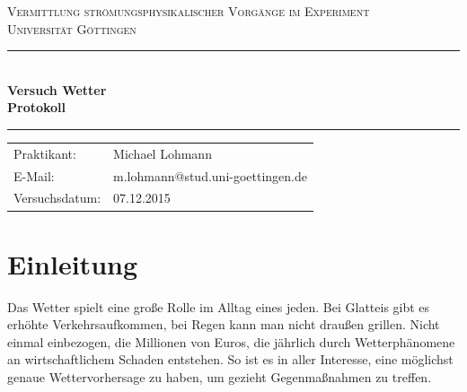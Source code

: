 \documentclass[12pt,a4paper,titlepage,headinclude,bibtotoc]{scrartcl}
\begin{document}
\begin{titlepage}
\centering
\textsc{\Large Vermittlung strömungsphysikalischer Vorgänge im Experiment
\\[1.5ex] Universität Göttingen}

\vspace*{3cm}

\rule{\textwidth}{1pt}\\[0.5cm]
{\huge \bfseries
  Versuch Wetter  \\[1.5ex]
  Protokoll}\\[0.5cm]
\rule{\textwidth}{1pt}

\vspace*{3cm}

\begin{Large}
\begin{tabular}{ll}
Praktikant: &  Michael Lohmann\\
 E-Mail: & m.lohmann@stud.uni-goettingen.de\\
 Versuchsdatum: & 07.12.2015\\
\end{tabular}
\end{Large}

\vspace*{0.8cm}

\begin{Large}
\end{Large}

\end{titlepage}

\tableofcontents

\newpage

\section{Einleitung}
\label{sec:einleitung}
Das Wetter spielt eine große Rolle im Alltag eines jeden.
Bei Glatteis gibt es erhöhte Verkehrsaufkommen, bei Regen kann man nicht draußen grillen.
Nicht einmal einbezogen, die Millionen von Euros, die jährlich durch Wetterphänomene an wirtschaftlichem Schaden entstehen.
So ist es in aller Interesse, eine möglichst genaue Wettervorhersage zu haben, um gezieht Gegenmaßnahmen zu treffen.
\end{document}
